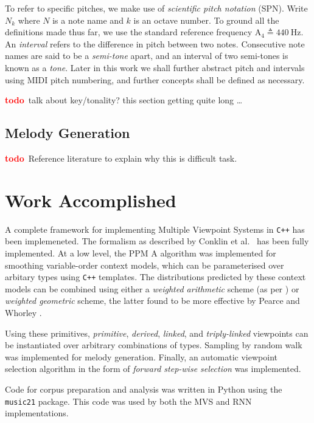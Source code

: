 \documentclass[12pt,a4paper,twoside,openright]{report}
\newcommand{\todo}{\textcolor{red}{\textbf{todo}~}}
\begin{document}
To refer to specific pitches, we make use of \emph{scientific pitch notation}
(SPN). Write $N_k$ where $N$ is a note name and $k$ is an octave number. To
ground all the definitions made thus far, we use the standard reference
frequency $\mathrm{A}_4 \triangleq 440\ \mathrm{Hz}$. An \emph{interval} refers
to the difference in pitch between two notes. Consecutive note names are said to
be a \emph{semi-tone} apart, and an interval of two semi-tones is known as a
\emph{tone}. Later in this work we shall further abstract pitch and intervals
using MIDI pitch numbering, and further concepts shall be defined as necessary.

\todo talk about key/tonality? this section getting quite long \ldots

\subsection{Melody Generation}

\todo Reference literature to explain why this is difficult task.

\section{Work Accomplished}

A complete framework for implementing Multiple Viewpoint Systems in \verb!C++!
has been implemeneted. The formalism as described by Conklin et al.\
\cite{conklin1995viewpoints} has been fully implemented.  At a low level, the
PPM A algorithm \cite{cleary1984ppm} was implemented for smoothing
variable-order context models, which can be parameterised over arbitary types
using \verb!C++!  templates. The distributions predicted by these context models
can be combined using either a \emph{weighted arithmetic} scheme (as per
\cite{conklin1995viewpoints}) or \emph{weighted geometric} scheme, the latter
found to be more effective by Pearce \cite{pearce2005construction} and Whorley
\cite{whorley2013phd}. 

Using these primitives, \emph{primitive}, \emph{derived}, \emph{linked}, and
\emph{triply-linked} viewpoints can be instantiated over arbitrary combinations
of types. Sampling by random walk was implemented for melody generation.
Finally, an automatic viewpoint selection algorithm in the form of \emph{forward
step-wise selection} \cite{whorley2013phd} was implemented.

Code for corpus preparation and analysis was written in Python using the
\texttt{music21} package. This code was used by both the MVS and RNN
implementations.
\end{document}

